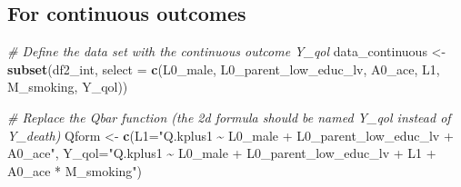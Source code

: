 \documentclass[
]{book}
\newenvironment{Shaded}{\begin{snugshade}}{\end{snugshade}}
\newcommand{\AttributeTok}[1]{\textcolor[rgb]{0.13,0.29,0.53}{#1}}
\newcommand{\CommentTok}[1]{\textcolor[rgb]{0.56,0.35,0.01}{\textit{#1}}}
\newcommand{\FunctionTok}[1]{\textcolor[rgb]{0.13,0.29,0.53}{\textbf{#1}}}
\newcommand{\NormalTok}[1]{#1}
\newcommand{\OtherTok}[1]{\textcolor[rgb]{0.56,0.35,0.01}{#1}}
\newcommand{\StringTok}[1]{\textcolor[rgb]{0.31,0.60,0.02}{#1}}
\begin{document}
\hypertarget{for-continuous-outcomes}{%
\subsection{For continuous outcomes}\label{for-continuous-outcomes}}

\begin{Shaded}
\begin{Highlighting}[]
\CommentTok{\# Define the data set with the continuous outcome Y\_qol}
\NormalTok{data\_continuous }\OtherTok{\textless{}{-}} \FunctionTok{subset}\NormalTok{(df2\_int, }\AttributeTok{select =} \FunctionTok{c}\NormalTok{(L0\_male, L0\_parent\_low\_educ\_lv,}
\NormalTok{                                              A0\_ace, L1,}
\NormalTok{                                              M\_smoking, Y\_qol))}

\CommentTok{\# Replace the Qbar function (the 2d formula should be named Y\_qol instead of Y\_death)}
\NormalTok{Qform }\OtherTok{\textless{}{-}} \FunctionTok{c}\NormalTok{(}\AttributeTok{L1=}\StringTok{"Q.kplus1 \textasciitilde{} L0\_male + L0\_parent\_low\_educ\_lv + A0\_ace"}\NormalTok{,}
           \AttributeTok{Y\_qol=}\StringTok{"Q.kplus1 \textasciitilde{} L0\_male + L0\_parent\_low\_educ\_lv + L1 +}
\StringTok{                    A0\_ace * M\_smoking"}\NormalTok{)}


\end{Highlighting}
\end{Shaded}
\end{document}
